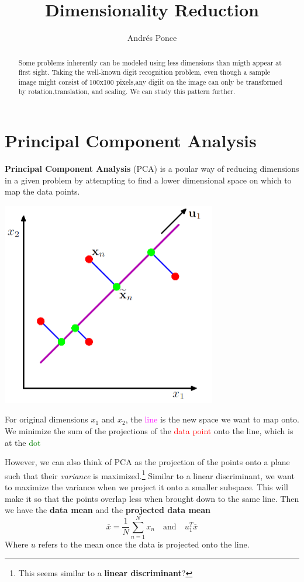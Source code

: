 \documentclass{tufte-handout}
\title{Dimensionality Reduction}
\author{Andr\'es Ponce}
\begin{document}
\maketitle
\begin{abstract}
Some problems inherently can be modeled using less dimensions
than migth appear at first sight. Taking the well-known digit
recognition problem, even though a sample image might consist of 
100x100 pixels,any digiit on the image can only be transformed by 
rotation,translation, and scaling. We can study this pattern further.
\end{abstract}
\section{Principal Component Analysis}
\textbf{Principal Component Analysis} (PCA) is a poular way of reducing 
dimensions in a given problem by attempting to find a lower dimensional
space on which to map the data points.

\begin{marginfigure}
	\includegraphics[scale=0.4]{pca}
	\caption{For original dimensions $x_{1}$ and $x_{2}$,  the \textcolor{magenta}{line}
		is the new space we want to map onto. We minimize the sum of the projections of the 
		\textcolor{red}{data point} onto the line, which is at the \textcolor{green}{dot}}
\end{marginfigure}

However, we can also think of PCA as the projection of the points onto a plane such that their
\textit{variance} is maximized.\footnote{This seems similar to a \textbf{linear discriminant}?}
Similar to a linear discriminant, we want to maximize the variance when we project it onto a 
smaller subspace. This will make it so that the points overlap less when brought down to the same line.
Then we have the \textbf{data mean} and the \textbf{projected data mean}
\begin{equation}
\overline{x} = \frac{1}{N}\sum_{n=1}^{N}x_{n}\quad\mathrm{and}\quad u_{1}^{T}\overline{x}
\end{equation}
Where $u$ refers to the mean once the data is projected onto the line.
\end{document}
